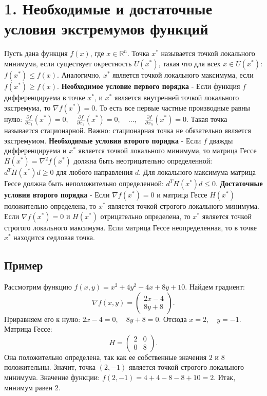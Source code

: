 \documentclass[12pt,a4paper]{article}
\begin{document}
\section{1. Необходимые и достаточные условия экстремумов функций}
Пусть дана функция $f(x)$, где $x \in \mathbb{R}^n$. Точка $x^*$ называется точкой локального минимума, если существует окрестность $U(x^*)$, такая что для всех $x \in U(x^*)$: $f(x^*) \le f(x).$
Аналогично, $x^*$ является точкой локального максимума, если $f(x^*) \ge f(x).$
\textbf{Необходимое условие первого порядка} - Если функция $f$ дифференцируема в точке $x^*$, и $x^*$ является внутренней точкой локального экстремума, то $\nabla f(x^*) = 0.$
То есть все первые частные производные равны нулю: $\frac{\partial f}{\partial x_1}(x^*) = 0,\quad \frac{\partial f}{\partial x_2}(x^*) = 0,\quad \ldots,\quad \frac{\partial f}{\partial x_n}(x^*) = 0.$
Такая точка называется стационарной. Важно: стационарная точка не обязательно является экстремумом.
\textbf{Необходимые условия второго порядка} - Если $f$ дважды дифференцируема и $x^*$ является точкой локального минимума, то матрица Гессе $H(x^*) = \nabla^2 f(x^*)$
должна быть неотрицательно определенной: $d^T H(x^*) d \ge 0$
для любого направления $d$.
Для локального максимума матрица Гессе должна быть неположительно определенной: $d^T H(x^*) d \le 0.$
\textbf{Достаточные условия второго порядка} - Если $\nabla f(x^*) = 0$
и матрица Гессе $H(x^*)$ положительно определена, то $x^*$ является точкой строгого локального минимума.
Если $\nabla f(x^*) = 0$
и $H(x^*)$ отрицательно определена, то $x^*$ является точкой строгого локального максимума.
Если матрица Гессе неопределенная, то в точке $x^*$ находится седловая точка.
\subsection{Пример}
Рассмотрим функцию $f(x,y) = x^2 + 4y^2 - 4x + 8y + 10.$
Найдем градиент:
\[
\nabla f(x,y) =
\begin{pmatrix}
2x - 4 \\
8y + 8
\end{pmatrix}.
\]
Приравняем его к нулю: $2x - 4 = 0,\quad 8y + 8 = 0.$
Отсюда $x = 2,\quad y = -1.$
Матрица Гессе:
\[
H =
\begin{pmatrix}
2 & 0 \\
0 & 8
\end{pmatrix}.
\]
Она положительно определена, так как ее собственные значения $2$ и $8$ положительны. Значит, точка $(2,-1)$
является точкой строгого локального минимума.
Значение функции: $f(2,-1) = 4 + 4 - 8 - 8 + 10 = 2.$
Итак, минимум равен $2$.
\end{document}
